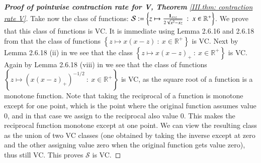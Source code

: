 \begin{proof}[\hypertarget{III.proof contraction pointwise V}{\textbf{Proof of pointwise contraction rate for V, Theorem} \ref{III.thm: contraction rate V}}]
    Take now the class of functions: $\mathcal{S} := \left\{ z \mapsto \frac{\mathbf{1}_{x > z}}{2 \sqrt{x^2 - xz}} \: : \: x \in \mathbb{R}^{+} \right\}$. We prove that this class of functions is VC. It is immediate using Lemma 2.6.16 and 2.6.18 from \cite{5} that the class of functions $\left\{ z \mapsto x(x-z) \: : \: x \in \mathbb{R}^+ \right\}$ is VC. Next by Lemma 2.6.18 (ii) in \cite{5} we see that the class $\left\{ z \mapsto x(x-z)_{+} \: : \: x \in \mathbb{R}^+ \right\}$ is VC. Again by Lemma 2.6.18 (viii) in \cite{5} we see that the class of functions $\left\{ z \mapsto \left( x(x-z)_{+} \right)^{-1/2} \: : \: x \in \mathbb{R}^+ \right\}$ is VC, as the square root of a function is a monotone function. Note that taking the reciprocal of a function is monotone except for one point, which is the point where the original function assumes value 0, and in that case we assign to the reciprocal also value 0. This makes the reciprocal function monotone except at one point. We can view the resulting class as the union of two VC classes (one obtained by taking the inverse except at zero and the other assigning value zero when the original function gets value zero), thus still VC. This proves $\mathcal{S}$ is VC.
    

\end{proof}
